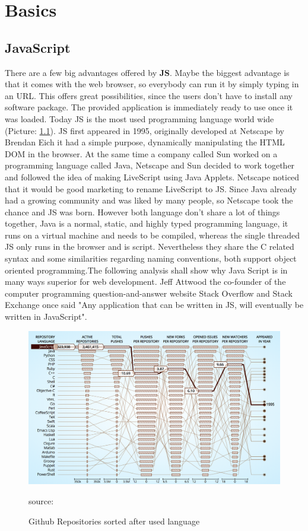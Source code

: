 \chapter{Basics}

\section{JavaScript}
There are a few big advantages offered by \textbf{\gls{JS}}. Maybe the biggest advantage is that it comes with the web browser, so everybody can run it by simply typing in an \gls{URL}. This offers great possibilities, since the users don't have to install any software package. The provided application is immediately ready to use once it was loaded. Today \gls{JS} is the most used programming language world wide (Picture: \ref{fig:JS}). \gls{JS} first appeared in 1995, originally developed at Netscape by Brendan Eich it had a simple purpose, dynamically manipulating the HTML DOM in the browser. At the same time a company called Sun worked on a programming language called Java, Netscape and Sun decided to work together and followed the idea of making LiveScript using Java Applets.  Netscape noticed that it would be good marketing to rename LiveScript to \gls{JS}. Since Java already had a growing community and was liked by many people, so Netscape took the chance and \gls{JS} was born. However both language don't share a lot of things together, Java is a normal, static, and highly typed programming language, it runs on a virtual machine and needs to be compiled, whereas the single threaded \gls{JS} only runs in the browser and is script. Nevertheless they share the C related syntax and some similarities regarding naming conventions, both support object oriented programming.The following analysis shall show why Java Script is in many ways superior for web development. Jeff Attwood the co-founder of the  computer programming question-and-answer website Stack Overflow and Stack Exchange once said "Any application that can be written in \gls{JS}, will eventually be written in JavaScript". \cite{HistoryJS1} \cite{HistoryJS2} \cite{HistoryJS3}

\begin{figure}
	\centering
	\includegraphics[scale=0.5]{bilder/grundlagen/jsUsage.png}
	\caption{Github Repositories sorted after used language} source:\cite{JS}
	\label{fig:JS}
\end{figure}

